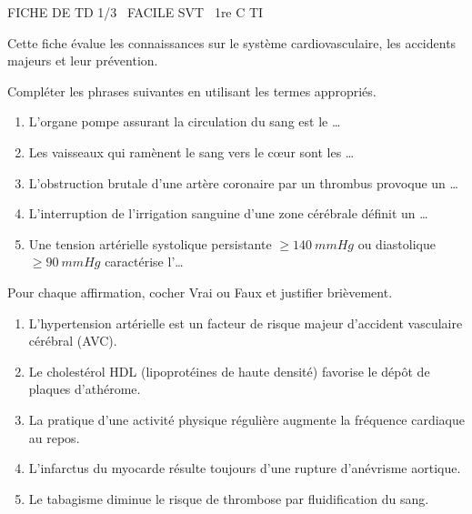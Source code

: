 \documentclass[11pt]{article}
\begin{document}
\begin{tcolorbox}[enhanced,colback=popink,colframe=popink,arc=10pt,boxrule=0pt,left=12pt,right=12pt,top=9pt,bottom=9pt]
{\color{white}\popxbold\small FICHE DE TD 1/3 \textbullet\ FACILE \hfill SVT \textbullet\ 1re C TI\par}
\end{tcolorbox}
\vspace{4pt}
Cette fiche évalue les connaissances sur le système cardiovasculaire, les accidents majeurs et leur prévention.

\begin{exercice}
Compléter les phrases suivantes en utilisant les termes appropriés.
\begin{enumerate}
    \item L'organe pompe assurant la circulation du sang est le \ldots
    \item Les vaisseaux qui ramènent le sang vers le cœur sont les \ldots
    \item L'obstruction brutale d'une artère coronaire par un thrombus provoque un \ldots
    \item L'interruption de l'irrigation sanguine d'une zone cérébrale définit un \ldots
    \item Une tension artérielle systolique persistante $\ge \SI{140}{mmHg}$ ou diastolique $\ge \SI{90}{mmHg}$ caractérise l'\ldots
\end{enumerate}
\end{exercice}

\begin{exercice}
Pour chaque affirmation, cocher Vrai ou Faux et justifier brièvement.
\begin{enumerate}
    \item L'hypertension artérielle est un facteur de risque majeur d'accident vasculaire cérébral (AVC).
    \item Le cholestérol HDL (lipoprotéines de haute densité) favorise le dépôt de plaques d'athérome.
    \item La pratique d'une activité physique régulière augmente la fréquence cardiaque au repos.
    \item L'infarctus du myocarde résulte toujours d'une rupture d'anévrisme aortique.
    \item Le tabagisme diminue le risque de thrombose par fluidification du sang.
\end{enumerate}
\end{exercice}
\end{document}
